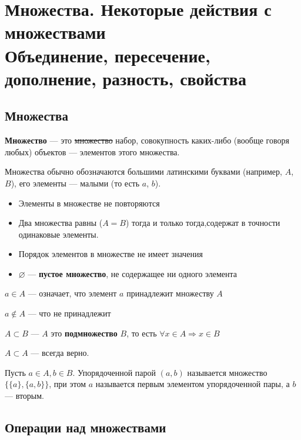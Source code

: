\newpage
\tableofcontents
\newpage
\section{Множества. Некоторые действия с множествами\\ {\normalfont Объединение, пересечение, дополнение, разность, свойства}}
\subsection{Множества}
\textbf{Множество} — это \sout{множество} набор, совокупность каких-либо (вообще говоря любых) объектов — элементов этого множества.

Множества обычно обозначаются большими латинскими буквами (например, $A$, $B$), его элементы — малыми (то есть $a$, $b$).

\begin{itemize}
    \setlength\itemsep{-0.2em}
    \item Элементы в множестве не повторяются
    \item Два множества равны ($A = B$) тогда и только тогда, содержат в точности одинаковые элементы.
    \item Порядок элементов в множестве не имеет значения
    \item $\varnothing$ — \textbf{пустое множество}, не содержащее ни одного элемента
\end{itemize}

$a \in A$ — означает, что элемент $a$ принадлежит множеству $A$

$a \notin A$ — что не принадлежит

$A \subset B$ — $A$ это \textbf{подмножество} $B$, то есть $\forall x \in A \Rightarrow x \in B$

$A \subset A$ — всегда верно.

Пусть $a \in A, b \in B$. Упорядоченной парой $(a, b)$ называется множество $\{\{a\}, \{a, b\}\}$, при этом $a$ называется первым элементом упорядоченной пары, а $b$ — вторым.

\subsection{Операции над множествами}

